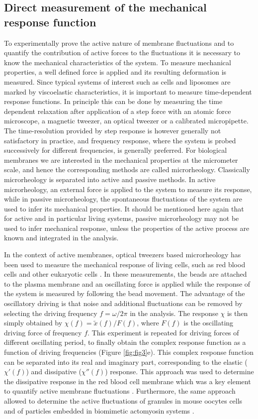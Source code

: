 \documentclass[graybox]{svmult}
\begin{document}
\subsection{Direct measurement of the mechanical response function}
	\label{resp}
To experimentally prove the active nature of membrane fluctuations and to quantify the contribution of active forces to the fluctuations it is necessary to know the mechanical characteristics of the system. To measure mechanical properties, a well defined force is applied and its resulting deformation is measured. Since typical systems of interest such as cells and liposomes are marked by viscoelastic characteristics, it is important to measure time-dependent response functions. In principle this can be done by measuring the time dependent relaxation after application of a step force with an atomic force microscope, a magnetic tweezer, an optical tweezer or a calibrated micropipette. The time-resolution provided by step response is however generally not satisfactory in practice, and frequency response, where the system is probed successively for different frequencies, is generally preferred.
For biological membranes we are interested in the mechanical properties at the micrometer scale, and hence the corresponding methods are called microrheology. Classically microrheology is separated into active and passive methods. In active microrheology, an external force is applied to the system to measure its response, while in passive microrheology, the spontaneous fluctuations of the system are used to infer its mechanical properties. It should be mentioned here again that for active and in particular living systems, passive microrheology may not be used to infer mechanical response, unless the properties of the active process are known and integrated in the analysis.

In the context of active membranes, optical tweezers based microrheology has been used to measure the mechanical response of living cells, such as red blood cells and other eukaryotic cells \cite{Schlosser:2015}. In these measurements, the beads are attached to the plasma membrane and an oscillating force is applied while the response of the system is measured by following the bead movement. The advantage of the oscillatory driving is that noise and additional fluctuations can be removed by selecting the driving frequency $f = \omega/2\pi$ in the analysis. The response $\chi$ is then simply obtained by $\chi (f)=\tilde{x}(f)/F(f)$, where $F(f)$ is the oscillating driving force of frequency $f$. This experiment is repeated for driving forces of different oscillating period, to finally obtain the complex response function as a function of driving frequencies (Figure \ref{fig:fig3}e). This complex response function can be separated into its real and imaginary part, corresponding to the elastic ($\chi'(f)$) and dissipative ($\chi''(f)$) response. This approach was used to determine the dissipative response in the red blood cell membrane which was a key element to quantify active membrane fluctuations \cite{Turlier:2016}. Furthermore, the same approach allowed to determine the active fluctuations of granules in mouse oocytes cells \cite{Almonacid:2015} and of particles embedded in biomimetic actomyosin systems \cite{Mizuno:2007}.  
\end{document}
